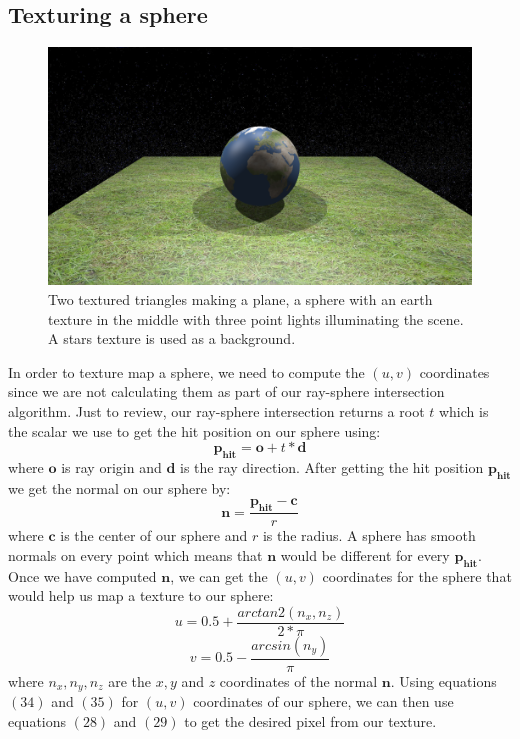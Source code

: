 \documentclass[11pt,a4paper]{article}
\begin{document}
	\subsection{Texturing a sphere}
	\begingroup
	\setlength{\intextsep}{5pt}
	\setlength{\columnsep}{35pt}
	\begin{figure}
		\centering
		\includegraphics[width=\linewidth]{textured_sphere.png}
		\caption{Two textured triangles making a plane, a sphere with an earth texture in the middle with three point lights illuminating the scene. A stars texture is used as a background.}\label{fig:textured_sphere}
	\end{figure}
	In order to texture map a sphere, we need to compute the $(u, v)$ coordinates since we are not calculating them as part of our ray-sphere intersection algorithm. Just to review, our ray-sphere intersection returns a root $t$ which is the scalar we use to get the hit position on our sphere using:
	\begin{equation}
	\boldsymbol{p_{hit}} = \boldsymbol{o} + t*\boldsymbol{d} 
	\end{equation}
	where $\boldsymbol{o}$ is ray origin and $\boldsymbol{d}$ is the ray direction. After getting the hit position $\boldsymbol{p_{hit}}$ we get the normal on our sphere by:
	\begin{equation}
	\boldsymbol{{n}} = \frac{\boldsymbol{p_{hit}} - \boldsymbol{c}}{r}
	\end{equation}
	where $\boldsymbol{c}$ is the center of our sphere and $r$ is the radius. A sphere has smooth normals on every point which means that $\boldsymbol{n}$ would be different for every $\boldsymbol{p_{hit}}$. Once we have computed $\boldsymbol{n}$, we can get the $(u, v)$ coordinates for the sphere that would help us map a texture to our sphere:
	\begin{equation}
	u = 0.5 + \frac{arctan2(n_{x}, n_{z})}{2 * \pi}
	\end{equation}
	\begin{equation}
	v = 0.5 - \frac{arcsin(n_{y})}{\pi}
	\end{equation}
	where $n_{x}, n_{y}, n_{z}$ are the $x, y$ and $z$ coordinates of the normal $\boldsymbol{n}$. Using equations $(34)$ and $(35)$ for $(u, v)$ coordinates of our sphere, we can then use equations $(28)$ and $(29)$ to get the desired pixel from our texture.
	\endgroup
\end{document}
